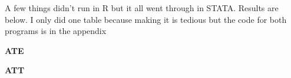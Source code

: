 \documentclass[11pt]{article}
\begin{document}
A few things didn't run in R but it all went through in STATA. Results are below. I only did one table because making it is tedious but the code for both programs is in the appendix 

\begin{center}
	
			\centering
	
	\textbf{ATE}\par\medskip
	\scalebox{0.85}{
	
}
\end{center}

\newpage

\begin{center}
	
	\centering
	
	\textbf{ATT}\par\medskip
	\scalebox{0.85}{
		
	}
\end{center}

\end{document}
